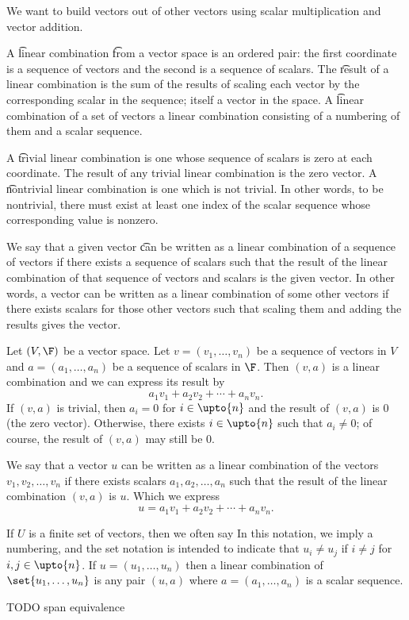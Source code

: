 

We want to build vectors out of other vectors using scalar multiplication and vector addition.


A \t{linear combination} \t{from} a vector space is an ordered pair: the first coordinate is a sequence of vectors and the second is a sequence of scalars.
The \t{result} of a linear combination is the sum of the results of scaling each vector by the corresponding scalar in the sequence; itself a vector in the space.
A \t{linear combination of a set} of vectors a linear combination consisting of a numbering of them and a scalar sequence.

A \t{trivial linear combination} is one whose sequence of scalars is zero at each coordinate.
The result of any trivial linear combination is the zero vector.
A \t{nontrivial linear combination} is one which is not trivial.
In other words, to be nontrivial, there must exist at least one index of the scalar sequence whose corresponding value is nonzero.

We say that a given vector \t{can be written as a linear combination of} a sequence of vectors if there exists a sequence of scalars such that the result of the linear combination of that sequence of vectors and scalars is the given vector.
In other words, a vector can be written as a linear combination of some other vectors if there exists scalars for those other vectors such that scaling them and adding the results gives the vector.


Let $(V, \F)$ be a vector space.
Let $v = (v_1, \dots, v_n)$ be a sequence of vectors in $V$ and
$a = (a_1, \dots, a_n)$ be a sequence of scalars in $\F$.
Then $(v, a)$ is a linear combination and we can express its result by
$$
  a_1v_1 + a_2v_2 + \cdots + a_n v_n.
$$
If $(v,a)$ is trivial, then $a_i = 0$ for $i \in \upto{n}$ and the result of $(v, a)$ is $0$ (the zero vector).
Otherwise, there exists $i \in \upto{n}$ such that $a_i \neq 0$; of course, the result of $(v, a)$ may still be $0$.

We say that a vector $u$ can be written as a linear combination of the vectors $v_1, v_2, \dots, v_n$ if there exists scalars $a_1, a_2, \dots, a_n$ such that the result of the linear combination $(v, a)$ is $u$.
Which we express
$$
  u = a_1v_1 + a_2v_2 + \cdots + a_nv_n.
$$

If $U$ is a finite set of vectors, then we often say 
In this notation, we imply a numbering, and the set notation is intended to indicate that $u_i \neq u_j$ if $i \neq j$ for $i, j \in \upto{n}$.
If $u = (u_1, \dots, u_n)$ then a linear combination of $\set{u_1, \dots, u_n}$ is any pair $(u, a)$ where $a = (a_1, \dots, a_n)$ is a scalar sequence.


TODO span equivalence
